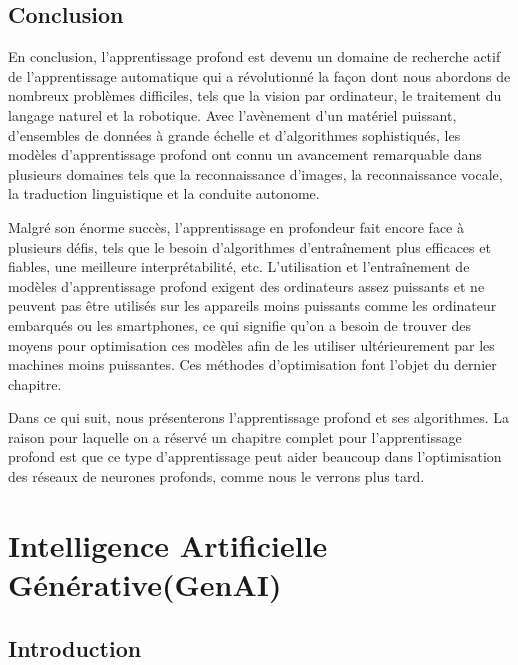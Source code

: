 \section{Conclusion}
En conclusion, l'apprentissage profond est devenu un domaine de recherche actif
de l'apprentissage automatique qui a révolutionné la façon dont nous abordons
de nombreux problèmes difficiles, tels que la vision par ordinateur, le
traitement du langage naturel et la robotique. Avec l'avènement d'un matériel
puissant, d'ensembles de données à grande échelle et d'algorithmes
sophistiqués, les modèles d'apprentissage profond ont connu un avancement
remarquable dans plusieurs domaines tels que la reconnaissance d'images, la
reconnaissance vocale, la traduction linguistique et la conduite autonome.

\medskip
Malgré son énorme succès, l'apprentissage en profondeur fait encore face à plusieurs défis, tels que le besoin d'algorithmes d'entraînement plus efficaces et fiables, une meilleure interprétabilité, etc. L’utilisation et l'entraînement de modèles d’apprentissage profond exigent des ordinateurs assez puissants et ne peuvent pas être utilisés sur les appareils moins puissants comme les ordinateur embarqués ou les smartphones, ce qui signifie qu'on a besoin de trouver des moyens pour optimisation ces modèles afin de les utiliser ultérieurement par les machines moins puissantes. Ces méthodes d'optimisation font l'objet du dernier chapitre.

\medskip
Dans ce qui suit, nous présenterons l'apprentissage profond et ses algorithmes. La raison pour laquelle on a réservé un chapitre complet pour l'apprentissage profond est que ce type d'apprentissage peut aider beaucoup dans l'optimisation des réseaux de neurones profonds, comme nous le verrons plus tard.

\clearpage






\chapter{Intelligence Artificielle Générative(GenAI)}
\section{Introduction}

